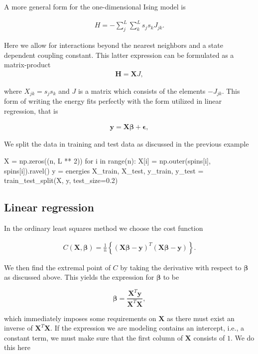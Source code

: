 \documentclass[%
oneside,                 %
final,                   %
10pt]{article}
\begin{document}
A more general form for the one-dimensional Ising model is

\begin{align}
    H = - \sum_j^L \sum_k^L s_j s_k J_{jk}.
\end{align}

Here we allow for interactions beyond the nearest neighbors and a state dependent
coupling constant. This latter expression can be formulated as
a matrix-product
\begin{align}
    \bm{H} = \bm{X} J,
\end{align}

where $X_{jk} = s_j s_k$ and $J$ is a matrix which consists of the
elements $-J_{jk}$. This form of writing the energy fits perfectly
with the form utilized in linear regression, that is

\begin{align}
    \bm{y} = \bm{X}\bm{\beta} + \bm{\epsilon},
\end{align}

We split the data in training and test data as discussed in the previous example

\bpycod
X = np.zeros((n, L ** 2))
for i in range(n):
    X[i] = np.outer(spins[i], spins[i]).ravel()
y = energies
X_train, X_test, y_train, y_test = train_test_split(X, y, test_size=0.2)
\epycod

\subsection{Linear regression}

In the ordinary least squares method we choose the cost function

\begin{align}
    C(\bm{X}, \bm{\beta})= \frac{1}{n}\left\{(\bm{X}\bm{\beta} - \bm{y})^T(\bm{X}\bm{\beta} - \bm{y})\right\}.
\end{align}

We then find the extremal point of $C$ by taking the derivative with respect to $\bm{\beta}$ as discussed above.
This yields the expression for $\bm{\beta}$ to be

\[
    \bm{\beta} = \frac{\bm{X}^T \bm{y}}{\bm{X}^T \bm{X}},
\]

which immediately imposes some requirements on $\bm{X}$ as there must exist
an inverse of $\bm{X}^T \bm{X}$. If the expression we are modeling contains an
intercept, i.e., a constant term, we must make sure that the
first column of $\bm{X}$ consists of $1$. We do this here
\end{document}
